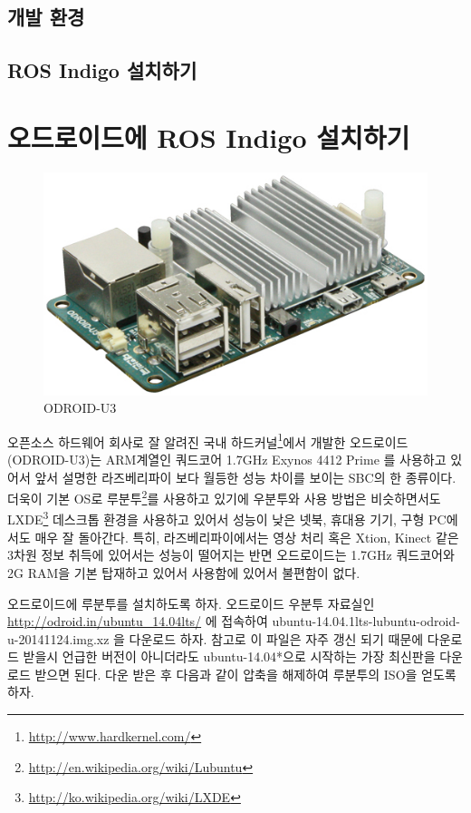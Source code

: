 \subsection{개발 환경}

\subsection{ROS Indigo 설치하기}


\newpage
\section{오드로이드에 ROS Indigo 설치하기}

\begin{figure}[h]
\centering\includegraphics[width=0.5\columnwidth]{pictures/chapter3/odroid.jpg}
\caption{ODROID-U3}
\end{figure}

오픈소스 하드웨어 회사로 잘 알려진 국내 하드커널\footnote{\url{http://www.hardkernel.com/}}에서 개발한 오드로이드(ODROID-U3)는 ARM계열인 쿼드코어 1.7GHz Exynos 4412 Prime 를 사용하고 있어서 앞서 설명한 라즈베리파이 보다 월등한 성능 차이를 보이는 SBC의 한 종류이다. 더욱이 기본 OS로 루분투\footnote{\url{http://en.wikipedia.org/wiki/Lubuntu}}를 사용하고 있기에 우분투와 사용 방법은 비슷하면서도 LXDE\footnote{\url{http://ko.wikipedia.org/wiki/LXDE}} 데스크톱 환경을 사용하고 있어서 성능이 낮은 넷북, 휴대용 기기, 구형 PC에서도 매우 잘 돌아간다. 특히, 라즈베리파이에서는 영상 처리 혹은 Xtion, Kinect 같은 3차원 정보 취득에 있어서는 성능이 떨어지는 반면 오드로이드는 1.7GHz 쿼드코어와 2G RAM을 기본 탑재하고 있어서 사용함에 있어서 불편함이 없다.

오드로이드에 루분투를 설치하도록 하자. 오드로이드 우분투 자료실인 \url{http://odroid.in/ubuntu_14.04lts/} 에 접속하여 ubuntu-14.04.1lts-lubuntu-odroid-u-20141124.img.xz 을 다운로드 하자. 참고로 이 파일은 자주 갱신 되기 때문에 다운로드 받을시 언급한 버전이 아니더라도 ubuntu-14.04*으로 시작하는 가장 최신판을 다운로드 받으면 된다. 다운 받은 후 다음과 같이 압축을 해제하여 루분투의 ISO을 얻도록 하자.\\

